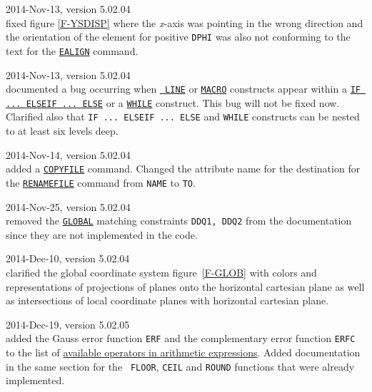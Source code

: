 \begin{madlist}
   2014-Nov-13, version 5.02.04\\
  fixed figure \ref{F-YSDISP} where the {\it x}-axis was pointing in
  the wrong direction and the orientation of the element for positive
  {\tt DPHI} was also not conforming to the text for the
  \hyperref[sec:ealign]{\tt EALIGN} command.


   2014-Nov-13, version 5.02.04\\
  documented a bug occurring when \hyperref[sec:line]{\tt 
  LINE} or \hyperref[sec:macro]{\tt MACRO} 
  constructs appear within a \hyperref[sec:if]{\tt IF ... ELSEIF ... ELSE} or a 
  \hyperref[sec:while]{\tt WHILE} construct. This bug will not be fixed now. \\ 
  Clarified also that {\tt IF ... ELSEIF ... ELSE} and {\tt WHILE} constructs 
  can be nested to at least six levels deep.


   2014-Nov-14, version 5.02.04\\
  added a \hyperref[sec:copyfile]{\tt COPYFILE} command. Changed the attribute 
  name for the destination for the \hyperref[sec:renamefile]{\tt RENAMEFILE} 
  command from {\tt NAME} to {\tt TO}.


   2014-Nov-25, version 5.02.04\\
  removed the \hyperref[sec:global]{\tt GLOBAL} matching constraints {\tt DDQ1, 
  DDQ2} from the documentation since they are not implemented in the code. 


   2014-Dec-10, version 5.02.04\\
  clarified the global coordinate system figure~\ref{F-GLOB} with colors and 
  representations of projections of planes onto the horizontal cartesian plane 
  as well as intersections of local coordinate planes with horizontal cartesian 
  plane. 


   2014-Dec-19, version 5.02.05\\
  added the Gauss error function {\tt ERF} and the complementary error function 
  {\tt ERFC} to the list of \hyperref[subsec:operator]{available operators in 
  arithmetic expressions}. Added documentation in the same section for the {\tt 
  FLOOR}, {\tt CEIL} and {\tt ROUND} functions that were already implemented. 

\end{madlist}
  


\newpage

